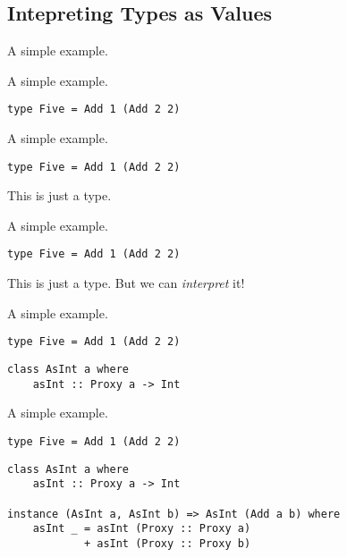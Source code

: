 \documentclass{beamer}
\begin{document}
\subsection{Intepreting Types as Values} %

\begin{frame}
A simple example.
\end{frame}

\begin{frame}[fragile]
A simple example.
\begin{verbatim}
type Five = Add 1 (Add 2 2)
\end{verbatim}
\end{frame}

\begin{frame}[fragile]
A simple example.
\begin{verbatim}
type Five = Add 1 (Add 2 2)
\end{verbatim}
This is just a type.
\end{frame}

\begin{frame}[fragile]
A simple example.
\begin{verbatim}
type Five = Add 1 (Add 2 2)
\end{verbatim}
This is just a type.
But we can \textit{interpret} it!
\end{frame}

\begin{frame}[fragile]
A simple example.
\begin{verbatim}
type Five = Add 1 (Add 2 2)
\end{verbatim}

\begin{verbatim}
class AsInt a where
    asInt :: Proxy a -> Int
\end{verbatim}
\end{frame}

\begin{frame}[fragile]
A simple example.
\begin{verbatim}
type Five = Add 1 (Add 2 2)
\end{verbatim}

\begin{verbatim}
class AsInt a where
    asInt :: Proxy a -> Int

instance (AsInt a, AsInt b) => AsInt (Add a b) where
    asInt _ = asInt (Proxy :: Proxy a)
            + asInt (Proxy :: Proxy b)
\end{verbatim}
\end{frame}
\end{document}
